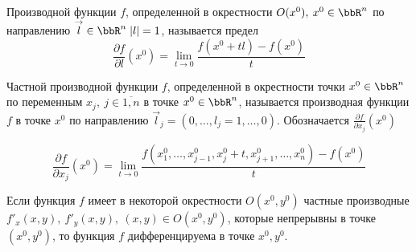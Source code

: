 \begin{defn}
Производной функции $f$, определенной в окрестности $O(x^0), \: x^0 \in \bbR^n$ по направлению $\overset{\to}{l} \in \bbR^n \; |l| = 1$, называется предел
$$
\frac{\partial f}{\partial l}(x^0) = \lim\limits_{t \to 0} \frac{f(x^0 + tl) - f(x^0)}{t}
$$
\end{defn}

\begin{defn}
Частной производной функции $f$, определенной в окрестности точки $x^0 \in \bbR^n$ по переменным $x_j, \: j \in \overline{1,n}$ в точке $x^0 \in \bbR^n$, называется производная функции $f$ в точке $x^0$ по направлению $\overset{\to}{l}_j = (0, \ldots, l_j = 1, \ldots, 0)$. Обозначается $\frac{\partial f}{\partial x_j}(x^0)$

$$
\frac{\partial f}{\partial x_j}(x^0) = \lim\limits_{t \to 0} \frac{f(x^0_1, \ldots, x^0_{j - 1}, x^0_j + t, x^0_{j + 1}, \ldots, x^0_n) - f(x^0)}{t}  
$$
\end{defn}


\begin{thm} \label{ch8th1}
Если функция $f$ имеет в некоторой окрестности $O(x^0, y^0)$ частные производные $f'_x(x,y), \: f'_y(x,y), \: (x,y) \in O(x^0, y^0)$, которые непрерывны в точке $(x^0, y^0)$, то функция $f$ дифференцируема в точке $x^0, y^0$.
\end{thm}

